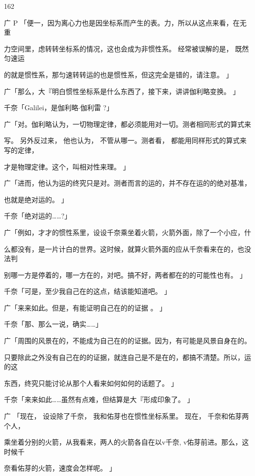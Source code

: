 162\par
广 P 「便一，因为离心力也是因坐标系而产生的表。力，所以从这点来看，在无重\par
力空间里，虑转转坐标系的情况，这也会成为非惯性系。 经常被误解的是， 既然匀速运\par
的就是惯性系，那匀速转转运的也是惯性系，但这完全是错的，请注意。 」\par
广「那么，大『明白惯性坐标系是什么东西了，接下来，讲讲伽利略变换。 」\par
千奈「Galilei，是伽利略$\cdot$伽利雷 ?」\par
广「对。伽利略认为，一切物理定律，都必须能用对一切。测者相同形式的算式来\par
写。 另外反过来， 他也认为， 不管从哪一。测者看， 都能用同样形式的算式来写的定律，\par
才是物理定律。这个，叫相对性来理。 」\par
广「进而，他认为运的终究只是对。测者而言的运的，并不存在运的的绝对基准，\par
也就是绝对运的。 」\par
千奈「绝对运的……?」\par
广「例如，才才的惯性系里，设设千奈乘坐着火箭，火箭外面，除了一个小应，什\par
么都没有，是一片计白的世界。这时候，就算火箭外面的应从千奈看来在的，也没法判\par
别哪一方是停着的，哪一方在的，对吧。搞不好，两者都在的的可能性也有。 」\par
千奈「可是，至少我自己在的这点，结该能知道吧。 」\par
广「来来如此。但是，有能证明自己在的的证据 。 」\par
千奈「那、那么一说，确实……」\par
广「周围的风景在的，不能成为自己在的的证据。因为，有可能是风景自身在的。\par
只要除此之外没有自己在的的证据，就连自己是不是在的，都搞不清楚。所以，运的这\par
东西，终究只能讨论从那个人看来如何如何的话题了。 」\par
千奈「来来如此……虽然有点难，但结算是大『形成印象了。 」\par
广 「现在， 设设除了千奈， 我和佑芽也在惯性坐标系里。 现在， 千奈和佑芽两个人，\par
乘坐着分别的火箭，从我看来，两人的火箭各自在以v千奈, v佑芽前进。那么，这时候千\par
奈看佑芽的火箭，速度会怎样呢。 」\par

